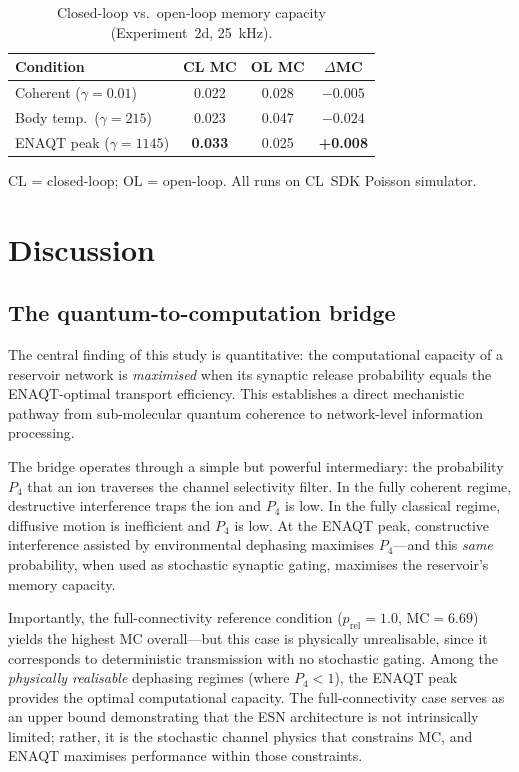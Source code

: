 \documentclass[twocolumn,11pt]{article}
\newcommand{\MC}{\mathrm{MC}}
\newcommand{\Pfour}{P_{4}}
\begin{document}
\begin{table}[b]
\caption{\label{tab:2d}Closed-loop vs.\ open-loop memory capacity
  (Experiment~2d, \SI{25}{\kilo\hertz}).}
\centering
\begin{tabular}{lccc}
  \toprule
  Condition & CL MC & OL MC & $\Delta$MC \\
  \midrule
  Coherent ($\gamma = 0.01$)  & 0.022 & 0.028 & $-0.005$ \\
  Body temp.\ ($\gamma = 215$) & 0.023 & 0.047 & $-0.024$ \\
  ENAQT peak ($\gamma = 1145$) & \textbf{0.033} & 0.025 & \textbf{+0.008} \\
  \bottomrule
\end{tabular}
\vspace{0.3em}
\par\noindent\small CL = closed-loop; OL = open-loop.
All runs on CL~SDK Poisson simulator.
\end{table}

\section{Discussion}
\label{sec:discussion}

\subsection{The quantum-to-computation bridge}

The central finding of this study is quantitative:
the computational capacity of a reservoir network is
\emph{maximised} when its synaptic release probability equals
the ENAQT-optimal transport efficiency.
This establishes a direct mechanistic pathway from
sub-molecular quantum coherence to network-level information
processing.

The bridge operates through a simple but powerful
intermediary: the probability $\Pfour$ that an ion traverses
the channel selectivity filter.  In the fully coherent regime,
destructive interference traps the ion and $\Pfour$ is low.
In the fully classical regime, diffusive motion is inefficient
and $\Pfour$ is low.  At the ENAQT peak, constructive
interference assisted by environmental dephasing maximises
$\Pfour$---and this \emph{same} probability, when used as
stochastic synaptic gating, maximises the reservoir's
memory capacity.

Importantly, the full-connectivity reference condition
($p_{\mathrm{rel}} = 1.0$, $\MC = 6.69$) yields the highest
MC overall---but this case is physically unrealisable, since it
corresponds to deterministic transmission with no stochastic
gating.  Among the \emph{physically realisable} dephasing
regimes (where $\Pfour < 1$), the ENAQT peak provides the
optimal computational capacity.  The full-connectivity case
serves as an upper bound demonstrating that the ESN architecture
is not intrinsically limited; rather, it is the stochastic
channel physics that constrains MC, and ENAQT maximises
performance within those constraints.
\end{document}
